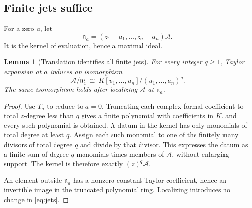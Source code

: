 \documentclass[11pt,letterpaper]{article}
\newtheorem{lemma}[lemma]{Lemma}
\theoremstyle{definition}
\theoremstyle{remark}
\newcommand{\A}{\mathscr A}
\newcommand{\nn}{\mathfrak n}
\numberwithin{equation}{section}
\begin{document}
\subsection{Finite jets suffice}
For a zero $a$, let
\[
 \nn_a=(z_1-a_1,\ldots,z_n-a_n)\A.
\]
It is the kernel of evaluation, hence a maximal ideal.

\begin{lemma}[Translation identifies all finite jets]\label{lem:jets}
For every integer $q\geq1$, Taylor expansion at $a$ induces an isomorphism
\begin{equation}\label{eq:jets}
 \A/\nn_a^q\ \cong\ K[u_1,\ldots,u_n]/(u_1,\ldots,u_n)^q.
\end{equation}
The same isomorphism holds after localizing $\A$ at $\nn_a$.
\end{lemma}
\begin{proof}
Use $T_a$ to reduce to $a=0$. Truncating each complex formal coefficient to total $z$-degree less than $q$ gives a finite polynomial with coefficients in $K$, and every such polynomial is obtained. A datum in the kernel has only monomials of total degree at least $q$. Assign each such monomial to one of the finitely many divisors of total degree $q$ and divide by that divisor. This expresses the datum as a finite sum of degree-$q$ monomials times members of $\A$, without enlarging support. The kernel is therefore exactly $(z)^q\A$.

An element outside $\nn_a$ has a nonzero constant Taylor coefficient, hence an invertible image in the truncated polynomial ring. Localizing introduces no change in \eqref{eq:jets}.
\end{proof}
\end{document}
